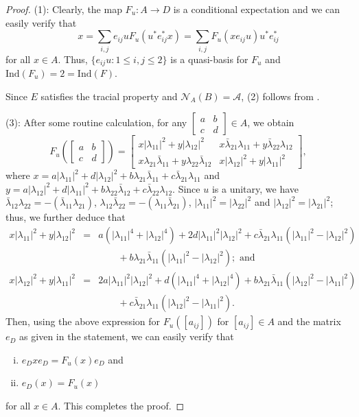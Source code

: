 \documentclass[a4]{amsart}
\numberwithin{equation}{section}
\begin{document}
\begin{proof}
(1): Clearly, the map $F_u: A \to D$
is a conditional expectation and we can easily verify that 
\[
x = \sum_{i,j} e_{ij}u F_u(u^*e_{ij}^*x) = \sum_{i,j} F_u(x
e_{ij}u) u^* e_{ij}^*
\]
for all $x
\in A$. Thus, $\{e_{ij}u : 1 \leq i,j \leq 2\}$ is a quasi-basis for $F_u$ and $\mathrm{Ind} (F_u) = 2= \mathrm{Ind}(F)$. \smallskip

 Since $E$ satisfies the tracial property and
$\mathcal{N}_A(B) =\mathcal{A}$, (2) follows from .\smallskip

(3): After some routine calculation, for any $\begin{bmatrix}a & b \\ c
  & d \end{bmatrix} \in A$, we obtain
\[
F_u \left( \begin{bmatrix}
	a & b \\ c & d
\end{bmatrix} \right )  =  \begin{bmatrix}
x |\lambda_{11}|^2 + y | \lambda_{12} |^2 & x
\bar{\lambda}_{21}\lambda_{11} + y \bar{\lambda}_{22} \lambda_{12}
\\ x \lambda_{21} \bar{\lambda}_{11} + y \lambda_{22}
\bar{\lambda}_{12} & x |\lambda_{12}|^2 + y |\lambda_{11} |^2
\end{bmatrix},
\]
where $ x = a |\lambda_{11}|^2 + d |\lambda_{12}|^2 + b \lambda_{21}
\bar{\lambda}_{11} + c \bar{\lambda}_{21} \lambda_{11} $ and $ y = a
|\lambda_{12}|^2 + d |\lambda_{11}|^2 + b \lambda_{22}
\bar{\lambda}_{12} + c \bar{\lambda}_{22} \lambda_{12} $. Since $u$ is a unitary, we have $
\bar{\lambda}_{12} \lambda_{22} = -(\bar{\lambda}_{11}\lambda_{21})$,
$ \lambda_{12}\bar{\lambda}_{22} = -(\lambda_{11} \bar{\lambda}_{21})
$, $|\lambda_{11}|^2 = |\lambda_{22}|^2$ and $ |\lambda_{12}|^2 =
|\lambda_{21}|^2 $; thus, we further deduce that
\begin{eqnarray*}
 x |\lambda_{11}|^2 + y |\lambda_{12}|^2 & = & a (
 |\lambda_{11}|^4 + | \lambda_{12}|^4) + 2 d |\lambda_{11}|^2
 |\lambda_{12}|^2 + c \bar{\lambda}_{21} \lambda_{11}(|\lambda_{11}|^2
 - |\lambda_{12}|^2) \\ & & \qquad + b\lambda_{21}
 \bar{\lambda}_{11}(|\lambda_{11}|^2 -|\lambda_{12}|^2); \text{ and }\\
  x |\lambda_{12}|^2 + y |\lambda_{11}|^2 
  &  = & 2a |\lambda_{11}|^2 |\lambda_{12}|^2 + d(|\lambda_{11}|^4 + |\lambda_{12}|^4) + b\lambda_{21} \bar{\lambda}_{11}(|\lambda_{12}|^2 - |\lambda_{11}|^2)\\
  & & \qquad + c \bar{\lambda}_{21} \lambda_{11}(|\lambda_{12}|^2 - |\lambda_{11}|^2). 
\end{eqnarray*}
Then, using the above expression for $F_u([a_{ij}])$ for $[a_{ij}] \in A$ and the
matrix $e_D$ as given in the statement, we can easily verify that 
\begin{enumerate}[(i)]
\item $e_D x e_D = F_u(x)e_D$ and
\item $e_D(x) = F_u(x)$
\end{enumerate}
for all $ x \in A$. This completes the proof.
\end{proof}
\end{document}
